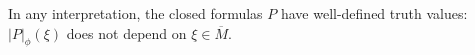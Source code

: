 In any interpretation, the closed formulas $P$ have well-defined truth values: $|P|_\phi(\xi)$ does not depend on $\xi \in \overline{M}$.
